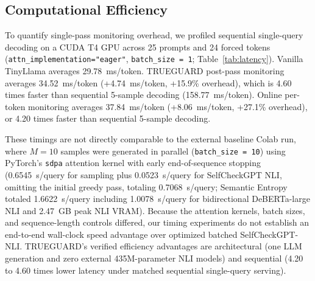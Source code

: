 \documentclass{ieeeaccess}
\begin{document}
\subsection{Computational Efficiency}
\label{sec:res_efficiency}
To quantify single-pass monitoring overhead, we profiled sequential single-query decoding on a CUDA T4 GPU across 25 prompts and 24 forced tokens (\texttt{attn\_implementation="eager"}, \texttt{batch\_size = 1}; Table~\ref{tab:latency}). Vanilla TinyLlama averages 29.78~ms/token. TRUEGUARD post-pass monitoring averages 34.52~ms/token (+4.74~ms/token, +15.9\% overhead), which is 4.60 times faster than sequential 5-sample decoding (158.77~ms/token). Online per-token monitoring averages 37.84~ms/token (+8.06~ms/token, +27.1\% overhead), or 4.20 times faster than sequential 5-sample decoding.

These timings are not directly comparable to the external baseline Colab run, where $M = 10$ samples were generated in parallel (\texttt{batch\_size = 10}) using PyTorch's \texttt{sdpa} attention kernel with early end-of-sequence stopping (0.6545~s/query for sampling plus 0.0523~s/query for SelfCheckGPT NLI, omitting the initial greedy pass, totaling 0.7068~s/query; Semantic Entropy totaled 1.6622~s/query including 1.0078~s/query for bidirectional DeBERTa-large NLI and 2.47~GB peak NLI VRAM). Because the attention kernels, batch sizes, and sequence-length controls differed, our timing experiments do not establish an end-to-end wall-clock speed advantage over optimized batched SelfCheckGPT-NLI. TRUEGUARD's verified efficiency advantages are architectural (one LLM generation and zero external 435M-parameter NLI models) and sequential (4.20 to 4.60 times lower latency under matched sequential single-query serving).

\begin{table}[t]
\centering
\caption{Controlled Sequential Inference Latency Profiling on CUDA T4 (\texttt{eager}, \texttt{bs=1}, $25 \times 24$ Tokens)}
\label{tab:latency}
\end{table}
\end{document}
